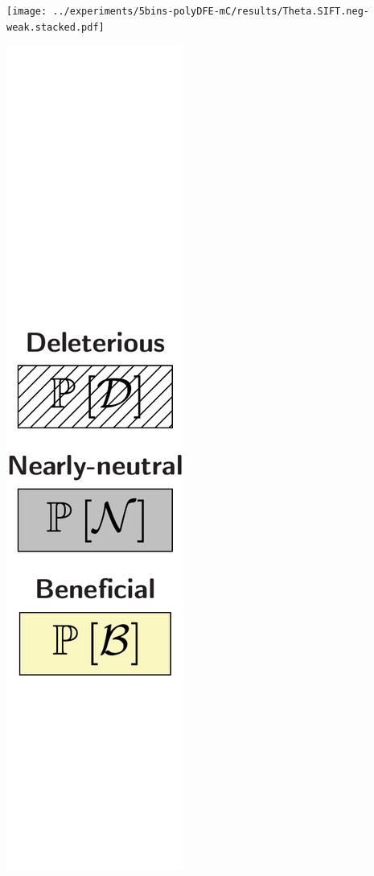\documentclass{article}
\begin{document}
\begin{center}
\begin{minipage}{0.09\linewidth}
        \end{minipage}
        \begin{minipage}{0.9\linewidth}
            \texttt{[image: ../experiments/5bins-polyDFE-mC/results/Theta.SIFT.neg-weak.stacked.pdf]} \\
        \end{minipage}
        \begin{minipage}{0.09\linewidth}
            \includegraphics[width=\linewidth, page=1]{artworks/legend.polycat}

\end{minipage}
\end{center}
\end{document}

